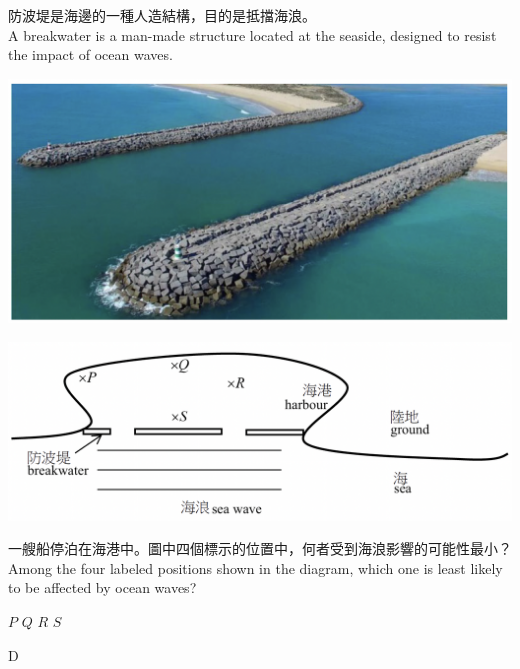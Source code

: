 {
    防波堤是海邊的一種人造結構，目的是抵擋海浪。\\A breakwater is a man-made structure located at the seaside, designed to resist the impact of ocean waves.
    \par{\par\centering\includegraphics[width=.45\textwidth]{./img/ch2_weekend_mc_2024-05-31-18-44-09.png}\par}
    \par{\par\centering\includegraphics[width=.45\textwidth]{./img/ch2_weekend_mc_2024-05-31-18-45-31.png}\par}
    一艘船停泊在海港中。圖中四個標示的位置中，何者受到海浪影響的可能性最小？\\Among the four labeled positions shown in the diagram, which one is least likely to be affected by ocean waves?
    \begin{tasks}
        \task $P$
        \task $Q$
        \task $R$
        \task $S$
    \end{tasks}

}{D}


